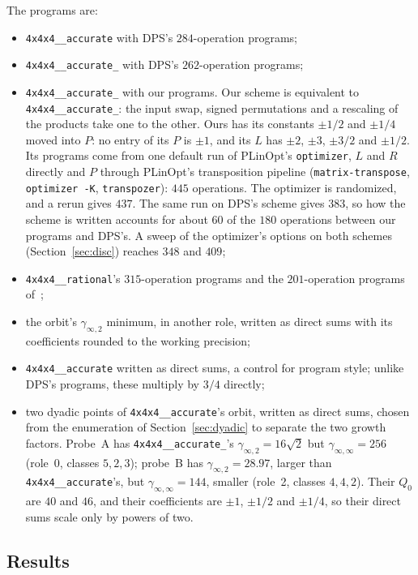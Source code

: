 \documentclass[11pt]{article}
\theoremstyle{remark}
\newcommand{\ginf}{\gamma_{\infty,2}}
\newcommand{\giinf}{\gamma_{\infty,\infty}}
\newcommand{\acc}{\texttt{4x4x4\_\allowbreak 48\_\allowbreak accurate}\xspace}
\newcommand{\acct}{\texttt{4x4x4\_\allowbreak 48\_\allowbreak accurate\_\allowbreak 262}\xspace}
\newcommand{\rat}{\texttt{4x4x4\_\allowbreak 48\_\allowbreak rational}\xspace}
\begin{document}
The programs are:
\begin{itemize}
\item \acc with DPS's $284$-operation programs;
\item \acct with DPS's $262$-operation programs;
\item \acct with our programs.  Our scheme is equivalent to \acct:
  the input swap, signed permutations and a rescaling of the products
  take one to the other.  Ours has its constants $\pm1/2$ and $\pm1/4$
  moved into $P$: no
  entry of its $P$ is $\pm1$, and its $L$ has $\pm2$, $\pm3$, $\pm3/2$
  and $\pm1/2$.  Its programs come from one default run of PLinOpt's
  \texttt{optimizer}, $L$ and $R$ directly and $P$ through PLinOpt's
  transposition pipeline (\texttt{matrix-transpose}, \texttt{optimizer
  -K}, \texttt{transpozer}): $445$ operations.  The optimizer is
  randomized, and a rerun gives $437$.  The same run on DPS's scheme
  gives $383$, so how the scheme is written accounts for about $60$ of
  the $180$ operations between our programs and DPS's.  A sweep of the
  optimizer's options on both schemes (Section~\ref{sec:disc}) reaches
  $348$ and $409$;
\item \rat's $315$-operation programs and the $201$-operation
  programs of~\cite{S26};
\item the orbit's $\ginf$ minimum, in another role, written as direct
  sums with its coefficients rounded to the working precision;
\item \acc written as direct sums, a control for program style; unlike
  DPS's programs, these multiply by $3/4$ directly;
\item two dyadic points of \acc's orbit, written as direct sums,
  chosen from the enumeration of Section~\ref{sec:dyadic} to separate
  the two growth factors.  Probe~A has \acct's
  $\ginf=16\sqrt2$ but $\giinf=256$ (role~0, classes $5,2,3$); probe~B
  has $\ginf=28.97$, larger than \acc's, but $\giinf=144$, smaller
  (role~2, classes $4,4,2$).  Their $Q_0$ are $40$ and $46$, and their
  coefficients are $\pm1$, $\pm1/2$ and $\pm1/4$, so their direct sums
  scale only by powers of two.
\end{itemize}

\subsection{Results}
\end{document}
